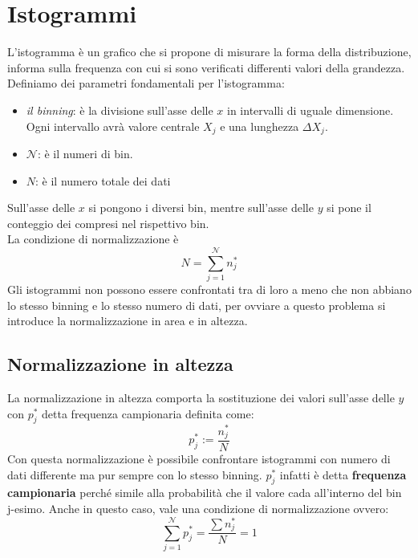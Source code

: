 \documentclass[11pt,a4paper]{book}
\begin{document}
\section{Istogrammi} 
L'istogramma è un grafico che si propone di misurare la forma della distribuzione, informa sulla frequenza con cui si sono verificati differenti valori della grandezza. Definiamo dei parametri fondamentali per l'istogramma:
\begin{itemize} 
\item \textit{il binning}: è la divisione sull'asse delle $ x $ in intervalli di uguale dimensione. Ogni intervallo avrà valore centrale $ X_j $ e una lunghezza $ \Delta X_j $. 
\item \textit{$ \mathcal{N} $}: è il numeri di bin.
\item $ N $: è il numero totale dei dati
\end{itemize}
Sull'asse delle $ x $ si pongono i diversi bin, mentre sull'asse delle $ y $ si pone il conteggio dei compresi nel rispettivo bin.\\
La condizione di normalizzazione è
\begin{equation}
N = \sum\limits_{j = 1}^{\mathcal{N}}n_j^*
\end{equation}
Gli istogrammi non possono essere confrontati tra di loro a meno che non abbiano lo stesso binning e lo stesso numero di dati, per ovviare a questo problema si introduce la normalizzazione in area e in altezza.
\subsection{Normalizzazione in altezza} 
La normalizzazione in altezza comporta la sostituzione dei valori sull'asse delle $ y $ con $ p^*_j $ detta frequenza campionaria definita come:
\begin{equation}
p^*_j := \frac{n_j^*}{N}
\end{equation}
Con questa normalizzazione è possibile confrontare istogrammi con numero di dati differente ma pur sempre con lo stesso binning. $ p^*_j $ infatti è detta \textbf{frequenza campionaria} perché simile alla probabilità che il valore cada all'interno del bin j-esimo. Anche in questo caso, vale una condizione di normalizzazione ovvero:
\begin{equation}
\sum\limits_{j = 1}^{\mathcal{N}}p_j^*  = \frac{\sum n_j^*}{N} = 1
\label{1.4.1_Condizzione normalizzazione altezza}
\end{equation}
\end{document}
